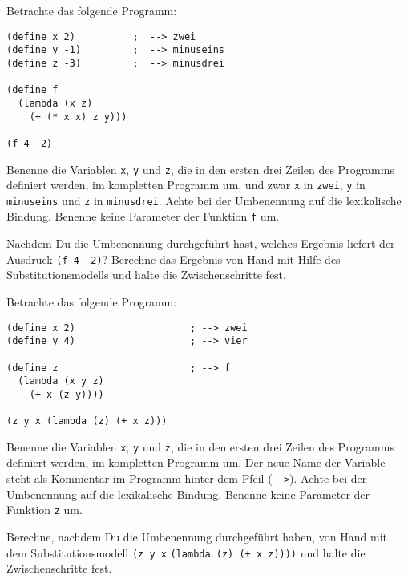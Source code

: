 \begin{aufgabe}

  Betrachte das folgende Programm:

\begin{lstlisting}
(define x 2)          ;  --> zwei
(define y -1)         ;  --> minuseins
(define z -3)         ;  --> minusdrei

(define f 
  (lambda (x z)
    (+ (* x x) z y)))

(f 4 -2)
\end{lstlisting}
  Benenne die Variablen \verb"x", \verb"y" und \verb"z", die in
  den ersten drei Zeilen des Programms definiert werden, im kompletten
  Programm um, und zwar \verb|x| in \verb|zwei|, \verb|y| in
  \verb|minuseins| und \verb|z| in \verb|minusdrei|. Achte bei
  der Umbenennung auf die lexikalische Bindung.  Benenne keine
  Parameter der Funktion \verb"f" um.

  Nachdem Du die Umbenennung durchgeführt hast, welches Ergebnis liefert
  der Ausdruck \verb"(f 4 -2)"? Berechne das Ergebnis von Hand mit Hilfe
  des Substitutionsmodells und halte die Zwischenschritte fest.
\end{aufgabe}

\begin{aufgabe}

  Betrachte das folgende Programm:

\begin{lstlisting}
(define x 2)                    ; --> zwei
(define y 4)                    ; --> vier

(define z                       ; --> f
  (lambda (x y z)
    (+ x (z y))))

(z y x (lambda (z) (+ x z)))
\end{lstlisting}
%
  Benenne die Variablen \verb"x", \verb"y" und \verb"z", die in
  den ersten drei Zeilen des Programms definiert werden, im kompletten
  Programm um. Der neue Name der Variable steht als Kommentar im
  Programm hinter dem Pfeil (\verb"-->").  Achte bei der
  Umbenennung auf die lexikalische Bindung.  Benenne keine
  Parameter der Funktion \verb"z" um.

  Berechne, nachdem Du die Umbenennung durchgeführt haben, von
  Hand mit dem Substitutionsmodell \verb"(z y x"
  \verb"(lambda (z) (+ x z))))" und halte die Zwischenschritte
  fest.

\end{aufgabe}

